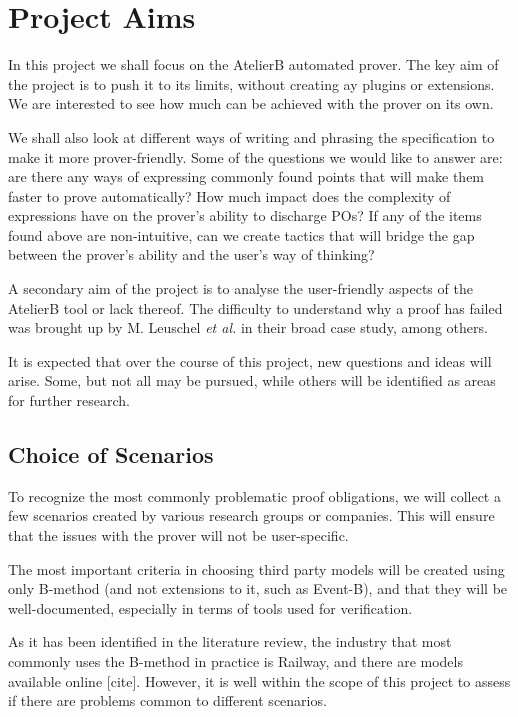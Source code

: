 \documentclass[11pt,journal]{IEEEtran}
\begin{document}
	
	
	\section{Project Aims}
	In this project we shall focus on the AtelierB automated prover. The key aim of the project is to push it to its limits, without creating ay plugins or extensions. We are interested to see how much can be achieved with the prover on its own.
	
	We shall also look at different ways of writing and phrasing the specification to make it more prover-friendly. Some of the questions we would like to answer are: are there any ways of expressing commonly found points that will make them faster to prove automatically? How much impact does the complexity of expressions have on the prover's ability to discharge POs? If any of the items found above are non-intuitive, can we create tactics that will bridge the gap between the prover's ability and the user's way of thinking?
	
	A secondary aim of the project is to analyse the user-friendly aspects of the AtelierB tool or lack thereof. The difficulty to understand why a proof has failed was brought up by M. Leuschel \emph{et al.} in their broad case study\cite{San Juan metro}, among others. 
	
	It is expected that over the course of this project, new questions and ideas will arise. Some, but not all may be pursued, while others will be identified as areas for further research.
	
	\subsection{Choice of Scenarios}
	To recognize the most commonly problematic proof obligations, we will collect a few scenarios created by various research groups or companies. This will ensure that the issues with the prover will not be user-specific. 
	
	The most important criteria in choosing third party models will be created using only B-method (and not extensions to it, such as Event-B), and that they will be well-documented, especially in terms of tools used for verification.
	
	As it has been identified in the literature review, the industry that most commonly uses the B-method in practice is Railway, and there are models available online [cite]. However, it is well within the scope of this project to assess if there are problems common to different scenarios.
	
\end{document}
